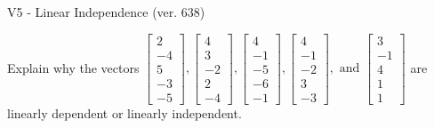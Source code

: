 \begin{exercise}
  \begin{exerciseTitle}V5 - Linear Independence (ver. 638)\end{exerciseTitle}
  \begin{exerciseStatement}
    Explain why the vectors \(\left[\begin{array}{r}
2 \\
-4 \\
5 \\
-3 \\
-5
\end{array}\right] , \left[\begin{array}{r}
4 \\
3 \\
-2 \\
2 \\
-4
\end{array}\right] , \left[\begin{array}{r}
4 \\
-1 \\
-5 \\
-6 \\
-1
\end{array}\right] , \left[\begin{array}{r}
4 \\
-1 \\
-2 \\
3 \\
-3
\end{array}\right] , \text{ and } \left[\begin{array}{r}
3 \\
-1 \\
4 \\
1 \\
1
\end{array}\right]\) are linearly dependent or linearly independent.	



\end{exerciseStatement}
\end{exercise}
